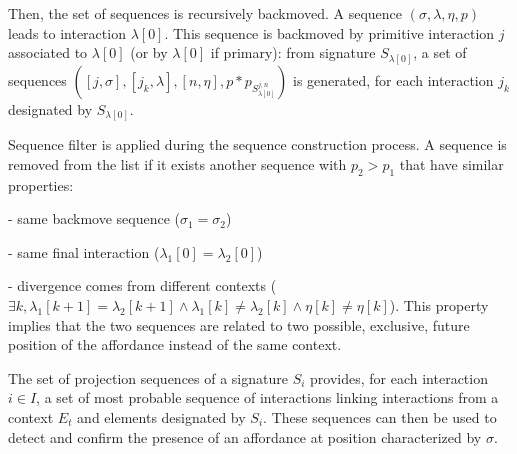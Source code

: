 \documentclass[conference]{IEEEtran}
\begin{document}
Then, the set of sequences is recursively backmoved. A sequence $(\sigma, \lambda, \eta, p)$ leads to interaction $\lambda[0]$. This sequence is backmoved by primitive interaction $j$ associated to $\lambda[0]$ (or by $\lambda[0]$ if primary): from signature $S_{\lambda[0]}$, a set of sequences $([j,\sigma], [j_k,\lambda], [n,\eta], p*p_{S_{\lambda[0]}^{j,n}})$ is generated, for each interaction $j_k$ designated by $S_{\lambda[0]}$.

Sequence filter is applied during the sequence construction process. A sequence is removed from the list if it exists another sequence with $p_2>p_1$ that have similar properties:

- same backmove sequence ($\sigma_1=\sigma_2$)

- same final interaction ($\lambda_1[0]=\lambda_2[0]$)

- divergence comes from different contexts ($\exists k, \lambda_1[k+1]=\lambda_2[k+1] \wedge \lambda_1[k] \neq \lambda_2[k] \wedge \eta[k] \neq\eta[k]$). This property implies that the two sequences are related to two possible, exclusive, future position of the affordance instead of the same context.

The set of projection sequences of a signature $S_i$ provides, for each interaction $i \in I$, a set of most probable sequence of interactions linking interactions from a context $E_t$ and elements designated by $S_i$. These sequences can then be used to detect and confirm the presence of an affordance at position characterized by $\sigma$.










\end{document}
